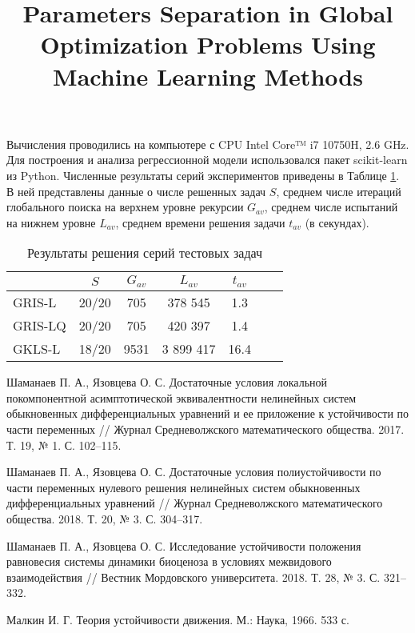 \documentclass[11pt, oneside, a4paper]{article}
\begin{document}
Вычисления проводились на компьютере с CPU Intel Core™ i7 10750H, 2.6 GHz. Для построения и анализа регрессионной модели использовался пакет scikit-learn из Python.
Численные результаты серий экспериментов приведены в Таблице \ref{tab1}.
В ней представлены данные о числе решенных задач $S$, среднем числе итераций глобального поиска на верхнем уровне рекурсии $G_{av}$, среднем числе испытаний на нижнем уровне $L_{av}$, среднем времени решения задачи $t_{av}$ (в секундах).

\begin{table}[ht]
	\caption{Результаты решения серий тестовых задач}
	\label{tab1}
	\begin{center}
		\begin{tabular}{ l c c c c c c } \hline
		 & $S$ &  $G_{av}$ &  $L_{av}$ & $t_{av}$ \\
    \hline
		GRIS-L & 20/20  & 705 &  378 545 & 1.3 \\
		GRIS-LQ & 20/20 & 705 &  420 397 & 1.4 \\
		GKLS-L & 18/20 & 9531 &  3 899 417 & 16.4 \\
		\hline
		\end{tabular}
	\end{center}
\end{table}

\begin{biblio}

 Шаманаев П. А., Язовцева О. С. Достаточные условия локальной покомпонентной асимптотической эквивалентности нелинейных систем обыкновенных дифференциальных уравнений и ее приложение к устойчивости по части переменных // Журнал Средневолжского математического общества. 2017. Т. 19, № 1. С. 102--115.

 Шаманаев П. А., Язовцева О. С. Достаточные условия полиустойчивости по части переменных нулевого решения нелинейных систем обыкновенных дифференциальных уравнений // Журнал Средневолжского математического общества.  2018. Т. 20, № 3. С. 304--317.

 Шаманаев П. А., Язовцева О. С. Исследование устойчивости положения равновесия системы динамики биоценоза в условиях межвидового взаимодействия // Вестник Мордовского университета. 2018. Т. 28, № 3. С. 321–332.

 Малкин И. Г. Теория устойчивости движения. М.: Наука, 1966. 533 с.

\end{biblio}

\title{Parameters Separation in Global Optimization Problems Using Machine Learning Methods}

\end{document}

